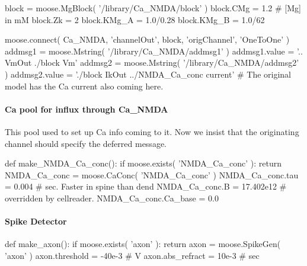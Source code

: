 \documentclass[]{article}%
\begin{document}
  block = moose.MgBlock( '/library/Ca_NMDA/block' )
  block.CMg = 1.2    #  [Mg] in mM
  block.Zk = 2
  block.KMg_A = 1.0/0.28
  block.KMg_B = 1.0/62

  moose.connect( Ca_NMDA, 'channelOut', block, 'origChannel', 'OneToOne' )
  addmsg1 = moose.Mstring( '/library/Ca_NMDA/addmsg1' )
  addmsg1.value = '.. VmOut  ./block  Vm'
  addmsg2 = moose.Mstring( '/library/Ca_NMDA/addmsg2' )
  addmsg2.value = './block  IkOut ../NMDA_Ca_conc current'
  # The original model has the Ca current also coming here.

\eatline
{}\nwendcode{}\nwdocspar
\paragraph{Ca pool for influx through {\Tt{}Ca{\_}NMDA\nwendquote}}

 This pool used to set up Ca info coming to it. Now we insist that the
 originating channel should specify the deferred message.

\nwenddocs{}\plusendmoddef\nwstartdeflinemarkup{}\nwenddeflinemarkup
def make_NMDA_Ca_conc():
  if moose.exists( 'NMDA_Ca_conc' ):
    return
  NMDA_Ca_conc = moose.CaConc( 'NMDA_Ca_conc' )
  NMDA_Ca_conc.tau = 0.004     # sec. Faster in spine than dend
  NMDA_Ca_conc.B = 17.402e12  # overridden by cellreader.
  NMDA_Ca_conc.Ca_base = 0.0

\eatline
{}\nwendcode{}\nwdocspar
\paragraph{Spike Detector}

\nwenddocs{}\endmoddef\nwstartdeflinemarkup{}\nwenddeflinemarkup
def make_axon():
  if moose.exists( 'axon' ):
    return
  axon = moose.SpikeGen( 'axon' )
  axon.threshold = -40e-3         # V
  axon.abs_refract = 10e-3        # sec
    
\end{document}

